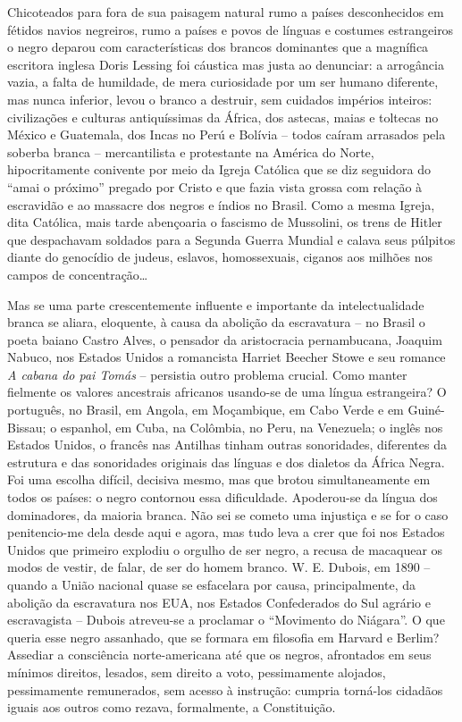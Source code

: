\documentclass[
  letterpaper,
  DIV=11,
  numbers=noendperiod]{scrreprt}
\begin{document}
Chicoteados para fora de sua paisagem natural rumo a países
desconhecidos em fétidos navios negreiros, rumo a países e povos de
línguas e costumes estrangeiros o negro deparou com características dos
brancos dominantes que a magnífica escritora inglesa Doris Lessing foi
cáustica mas justa ao denunciar: a arrogância vazia, a falta de
humildade, de mera curiosidade por um ser humano diferente, mas nunca
inferior, levou o branco a destruir, sem cuidados impérios inteiros:
civilizações e culturas antiquíssimas da África, dos astecas, maias e
toltecas no México e Guatemala, dos Incas no Perú e Bolívia -- todos
caíram arrasados pela soberba branca -- mercantilista e protestante na
América do Norte, hipocritamente conivente por meio da Igreja Católica
que se diz seguidora do ``amai o próximo'' pregado por Cristo e que
fazia vista grossa com relação à escravidão e ao massacre dos negros e
índios no Brasil. Como a mesma Igreja, dita Católica, mais tarde
abençoaria o fascismo de Mussolini, os trens de Hitler que despachavam
soldados para a Segunda Guerra Mundial e calava seus púlpitos diante do
genocídio de judeus, eslavos, homossexuais, ciganos aos milhões nos
campos de concentração\ldots{}

Mas se uma parte crescentemente influente e importante da
intelectualidade branca se aliara, eloquente, à causa da abolição da
escravatura -- no Brasil o poeta baiano Castro Alves, o pensador da
aristocracia pernambucana, Joaquim Nabuco, nos Estados Unidos a
romancista Harriet Beecher Stowe e seu romance \emph{A cabana do pai
Tomás} -- persistia outro problema crucial. Como manter fielmente os
valores ancestrais africanos usando-se de uma língua estrangeira? O
português, no Brasil, em Angola, em Moçambique, em Cabo Verde e em
Guiné-Bissau; o espanhol, em Cuba, na Colômbia, no Peru, na Venezuela; o
inglês nos Estados Unidos, o francês nas Antilhas tinham outras
sonoridades, diferentes da estrutura e das sonoridades originais das
línguas e dos dialetos da África Negra. Foi uma escolha difícil,
decisiva mesmo, mas que brotou simultaneamente em todos os países: o
negro contornou essa dificuldade. Apoderou-se da língua dos dominadores,
da maioria branca. Não sei se cometo uma injustiça e se for o caso
penitencio-me dela desde aqui e agora, mas tudo leva a crer que foi nos
Estados Unidos que primeiro explodiu o orgulho de ser negro, a recusa de
macaquear os modos de vestir, de falar, de ser do homem branco. W. E.
Dubois, em 1890 -- quando a União nacional quase se esfacelara por
causa, principalmente, da abolição da escravatura nos EUA, nos Estados
Confederados do Sul agrário e escravagista -- Dubois atreveu-se a
proclamar o ``Movimento do Niágara''. O que queria esse negro assanhado,
que se formara em filosofia em Harvard e Berlim? Assediar a consciência
norte-americana até que os negros, afrontados em seus mínimos direitos,
lesados, sem direito a voto, pessimamente alojados, pessimamente
remunerados, sem acesso à instrução: cumpria torná-los cidadãos iguais
aos outros como rezava, formalmente, a Constituição.
\end{document}
